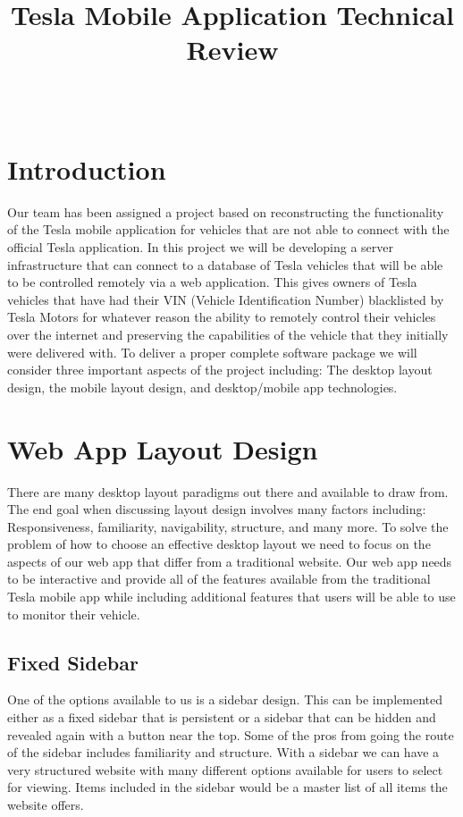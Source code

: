 \documentclass[10pt,draftclsnofoot,onecolumn,journal,compsoc]{IEEEtran}
\title{Tesla Mobile Application Technical Review}
\author{
  \IEEEauthorblockN{Christopher Jansen \\ Group 22 - Tesla Mobile App} \\
  \IEEEauthorblockA{CS 461: Senior Capstone Fall 2018 \\ Oregon State University}
}
\date{}
\begin{document}
\maketitle
\IEEEdisplaynontitleabstractindextext
\IEEEpeerreviewmaketitle
\newpage
\tableofcontents
\newpage

\section{Introduction}
Our team has been assigned a project based on reconstructing the functionality of the Tesla mobile application for vehicles that are not able to connect with the official Tesla application. In this project we will be developing a server infrastructure that can connect to a database of Tesla vehicles that will be able to be controlled remotely via a web application. This gives owners of Tesla vehicles that have had their VIN (Vehicle Identification Number) blacklisted by Tesla Motors for whatever reason the ability to remotely control their vehicles over the internet and preserving the capabilities of the vehicle that they initially were delivered with. To deliver a proper complete software package we will consider three important aspects of the project including: The desktop layout design, the mobile layout design, and desktop/mobile app technologies.

\section{Web App Layout Design}
There are many desktop layout paradigms out there and available to draw from. The end goal when discussing layout design involves many factors including: Responsiveness, familiarity, navigability, structure, and many more. To solve the problem of how to choose an effective desktop layout we need to focus on the aspects of our web app that differ from a traditional website. Our web app needs to be interactive and provide all of the features available from the traditional Tesla mobile app while including additional features that users will be able to use to monitor their vehicle.

\subsection{Fixed Sidebar}
One of the options available to us is a sidebar design. This can be implemented either as a fixed sidebar that is persistent or a sidebar that can be hidden and revealed again with a button near the top. Some of the pros from going the route of the sidebar includes familiarity and structure. With a sidebar we can have a very structured website with many different options available for users to select for viewing. Items included in the sidebar would be a master list of all items the website offers. 
\end{document}
